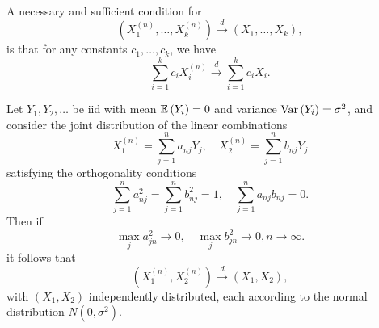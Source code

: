 \begin{theorem}\label{thm:convergence-in-distribution-by-linear-combinations}
	A necessary and sufficient condition for
	\begin{equation*}
		(X_{1}^{(n)},\ldots,X_k^{(n)})\stackrel{d}{\rightarrow}(X_{1},\ldots,X_k),
	\end{equation*}
	is that for any constants \(c_{1},\ldots,c_k\), we have
	\begin{equation*}
		\sum_{i=1}^{k}c_{i}X_{i}^{(n)}\stackrel{d}{\rightarrow}\sum_{i=1}^{k}c_{i}X_{i}.
	\end{equation*}
\end{theorem}

\begin{example}
	Let \(Y_{1},Y_{2},\ldots\) be iid with mean \(\mathbb{E}\left(Y_{i}\right)=0\) and variance \(\mathrm{Var}\left(Y_{i}\right)=\sigma^2\), and consider the joint distribution of the linear combinations
	\begin{equation*}
		X_{1}^{(n)}=\sum_{j=1}^{n}a_{nj}Y_{j},\quad X_{2}^{(n)}=\sum_{j=1}^{n}b_{nj}Y_{j}
	\end{equation*}
	satisfying the orthogonality conditions
	\begin{equation}
		\label{eq:orthogonality-conditions-2}
		\sum_{j=1}^{n}a_{nj}^{2}=\sum_{j=1}^{n}b_{nj}^2=1,\quad \sum_{j=1}^{n}a_{nj}b_{nj}=0.
	\end{equation}
	Then if
	\begin{equation*}
		\max_{j}a_{jn}^{2}\rightarrow 0,\quad\max_{j}b_{jn}^2\rightarrow 0,n \rightarrow \infty.
	\end{equation*}
	it follows that
	\begin{equation*}
		(X_{1}^{(n)},X_{2}^{(n)})\stackrel{d}{\rightarrow}(X_{1},X_{2}),
	\end{equation*}
	with \((X_{1},X_{2})\) independently distributed, each according to the normal distribution \(N\left(0,\sigma^2\right)\).
\end{example}

